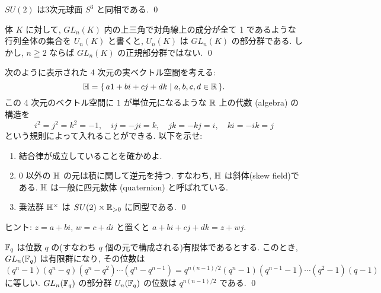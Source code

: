 \documentclass[12pt,twoside]{jarticle}
\def\R{{\Bbb R}} %
\def\F{{\Bbb F}}
\begin{document}
\begin{question}
  $SU(2)$ は3次元球面 $S^3$ と同相である. \qed
\end{question}

\begin{question}[三角行列のなす群]
  体 $K$ に対して, $GL_n(K)$ 内の上三角で対角線上の成分が全て 1 であるような
  行列全体の集合を $U_n(K)$ と書くと, $U_n(K)$ は $GL_n(K)$ の部分群である.
  しかし, $n\geqq2$ ならば $GL_n(K)$ の正規部分群ではない. \qed
\end{question}

\begin{question}
  次のように表示された 4 次元の実ベクトル空間を考える:
  \begin{equation*}
    {\Bbb H} = \{\, a1 + bi + cj + dk \mid a,b,c,d\in \R \,\}.
  \end{equation*}
  この 4 次元のベクトル空間に $1$ が単位元になるような $\R$ 上の代数 
  (algebra) の構造を 
  \begin{equation*}
    i^2 = j^2 = k^2 = -1, \quad
    ij = -ji = k, \quad
    jk = -kj = i, \quad
    ki = -ik = j
  \end{equation*}
  という規則によって入れることができる. 以下を示せ:
  \begin{enumerate}
  \item 結合律が成立していることを確かめよ.
  \item 0 以外の $\Bbb H$ の元は積に関して逆元を持つ.
    すなわち, $\Bbb H$ は斜体(skew field)である.
    $\Bbb H$ は一般に四元数体 (quaternion) と呼ばれている.
  \item 乗法群 ${\Bbb H}^\times$ は $SU(2)\times \R_{>0}$ に同型である.
    \qed
  \end{enumerate}
\end{question}

\noindent ヒント: $z=a+bi$, $w=c+di$ と置くと $a+bi+cj+dk=z+wj$.

%

\begin{question}[有限体上の一般線形群の位数]
  $\F_q$ は位数 $q$ の(すなわち $q$ 個の元で構成される)有限体であるとする.
  このとき, $GL_n(\F_q)$ は有限群になり, その位数は
  \begin{equation*}
    (q^n-1)(q^n-q)(q^n-q^2)\cdots(q^n-q^{n-1})
    =q^{n(n-1)/2} (q^n-1)(q^{n-1}-1)\cdots(q^2-1)(q-1)
  \end{equation*}
  に等しい. $GL_n(\F_q)$ の部分群 $U_n(\F_q)$ の位数は $q^{n(n-1)/2}$ である.
  \qed
\end{question}
\end{document}
